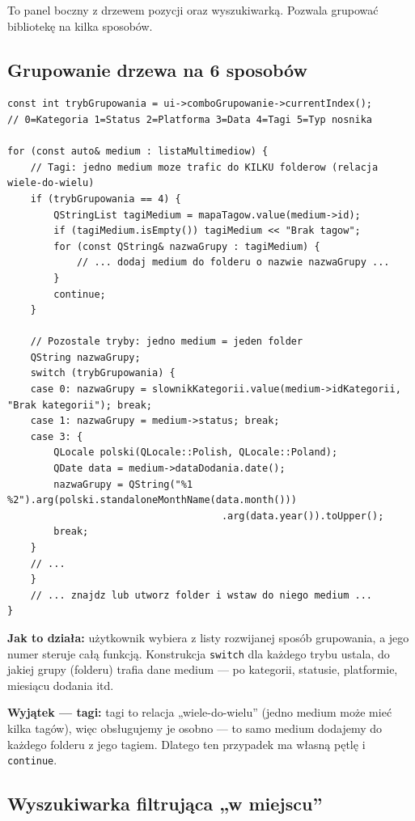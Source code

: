 \documentclass[11pt,a4paper]{article}
\begin{document}
To panel boczny z drzewem pozycji oraz wyszukiwarką. Pozwala grupować bibliotekę
na kilka sposobów.

\subsection{Grupowanie drzewa na 6 sposobów}

\begin{lstlisting}[caption={Jedno medium trafia do odpowiedniego folderu}]
const int trybGrupowania = ui->comboGrupowanie->currentIndex();
// 0=Kategoria 1=Status 2=Platforma 3=Data 4=Tagi 5=Typ nosnika

for (const auto& medium : listaMultimediow) {
    // Tagi: jedno medium moze trafic do KILKU folderow (relacja wiele-do-wielu)
    if (trybGrupowania == 4) {
        QStringList tagiMedium = mapaTagow.value(medium->id);
        if (tagiMedium.isEmpty()) tagiMedium << "Brak tagow";
        for (const QString& nazwaGrupy : tagiMedium) {
            // ... dodaj medium do folderu o nazwie nazwaGrupy ...
        }
        continue;
    }

    // Pozostale tryby: jedno medium = jeden folder
    QString nazwaGrupy;
    switch (trybGrupowania) {
    case 0: nazwaGrupy = slownikKategorii.value(medium->idKategorii, "Brak kategorii"); break;
    case 1: nazwaGrupy = medium->status; break;
    case 3: {
        QLocale polski(QLocale::Polish, QLocale::Poland);
        QDate data = medium->dataDodania.date();
        nazwaGrupy = QString("%1 %2").arg(polski.standaloneMonthName(data.month()))
                                     .arg(data.year()).toUpper();
        break;
    }
    // ...
    }
    // ... znajdz lub utworz folder i wstaw do niego medium ...
}
\end{lstlisting}

\textbf{Jak to działa:} użytkownik wybiera z listy rozwijanej sposób grupowania,
a jego numer steruje całą funkcją. Konstrukcja \texttt{switch} dla każdego trybu
ustala, do jakiej grupy (folderu) trafia dane medium --- po kategorii, statusie,
platformie, miesiącu dodania itd.

\textbf{Wyjątek --- tagi:} tagi to relacja „wiele-do-wielu” (jedno medium może mieć
kilka tagów), więc obsługujemy je osobno --- to samo medium dodajemy do każdego
folderu z jego tagiem. Dlatego ten przypadek ma własną pętlę i \texttt{continue}.

\subsection{Wyszukiwarka filtrująca „w miejscu”}
\end{document}
